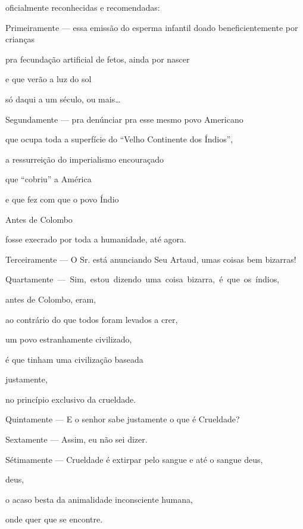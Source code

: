 oficialmente reconhecidas e recomendadas:


Primeiramente --- essa emissão do esperma infantil doado beneficientemente
por crianças

pra fecundação artificial de fetos, ainda por nascer

e que verão a luz do sol

só daqui a um século, ou mais\ldots{}


Segundamente --- pra denúnciar pra esse mesmo povo Americano

que ocupa toda a superfície do ``Velho Continente dos Índios'',

a ressurreição do imperialismo encouraçado

que ``cobriu'' a América

e que fez com que o povo Índio

Antes de Colombo \EP[1]

fosse execrado por toda a humanidade, até agora.


Terceiramente --- O Sr. está anunciando Seu Artaud, umas coisas bem bizarras!


\mbox{Quartamente --- Sim, estou dizendo uma coisa bizarra, é que os índios,}

antes de Colombo, eram,

ao contrário do que todos foram levados a crer,

um povo estranhamente civilizado,

é que tinham uma civilização baseada

justamente,

no princípio exclusivo da crueldade.


Quintamente --- E o senhor sabe justamente o que é Crueldade?


Sextamente --- Assim, eu não sei dizer.

Sétimamente --- Crueldade é extirpar pelo sangue e até o sangue deus,

deus,

o acaso besta da animalidade inconsciente humana, 

onde quer que se encontre.

